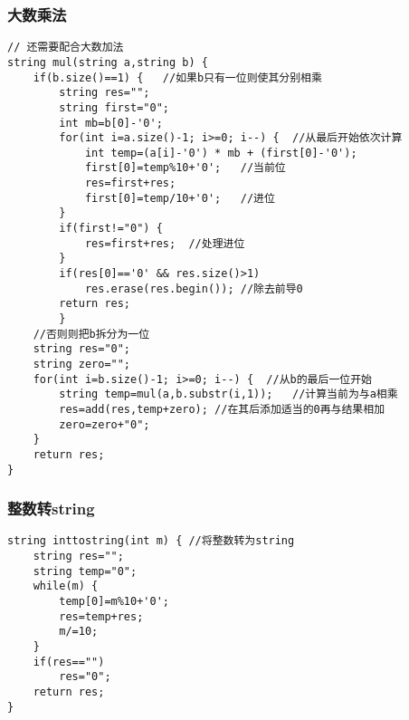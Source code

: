 \subsubsection{大数乘法}
\begin{lstlisting}
// 还需要配合大数加法
string mul(string a,string b) {
	if(b.size()==1) {	//如果b只有一位则使其分别相乘
		string res="";
		string first="0";
		int mb=b[0]-'0';
		for(int i=a.size()-1; i>=0; i--) {	//从最后开始依次计算
			int temp=(a[i]-'0') * mb + (first[0]-'0');
			first[0]=temp%10+'0';	//当前位
			res=first+res;
			first[0]=temp/10+'0';	//进位
		}
		if(first!="0") {
			res=first+res;	//处理进位
		}
		if(res[0]=='0' && res.size()>1)
			res.erase(res.begin());	//除去前导0
		return res;
		}
	//否则则把b拆分为一位
	string res="0";
	string zero="";
	for(int i=b.size()-1; i>=0; i--) {	//从b的最后一位开始
		string temp=mul(a,b.substr(i,1));	//计算当前为与a相乘
		res=add(res,temp+zero);	//在其后添加适当的0再与结果相加
		zero=zero+"0";
	}
	return res;
}
\end{lstlisting}

\subsubsection{整数转string}
\begin{lstlisting}
string inttostring(int m) {	//将整数转为string
	string res="";
	string temp="0";
	while(m) {
		temp[0]=m%10+'0';
		res=temp+res;
		m/=10;
	}
	if(res=="")
		res="0";
	return res;
}
\end{lstlisting}


